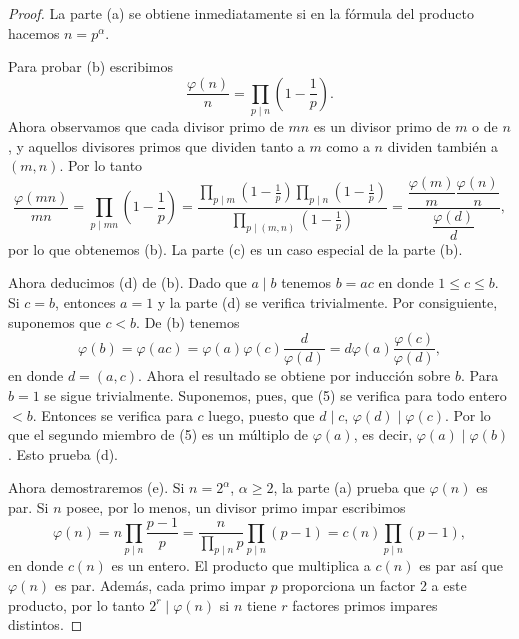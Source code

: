 \documentclass[12pt,a4paper]{book}
\begin{document}
    \begin{proof}
        La parte (a) se obtiene inmediatamente si en la fórmula del producto hacemos
        $n=p^{\alpha}$.

        Para probar (b) escribimos
        \begin{equation*}
            \frac{\varphi(n)}{n}=\prod_{p\mid n}\left(1-\frac{1}{p}\right).
        \end{equation*}
        Ahora observamos que cada divisor primo de $mn$ es un divisor primo de $m$ o de $n$,
        y aquellos divisores primos que dividen tanto a $m$ como a $n$ dividen también a
        $(m,n)$. Por lo tanto
        \begin{equation*}
            \frac{\varphi(mn)}{mn}=\prod_{p\mid mn}\left(1-\frac{1}{p}\right)
            =\frac{\displaystyle\prod_{p\mid m}\left(1-\frac{1}{p}\right)
            \prod_{p\mid n}\left(1-\frac{1}{p}\right)}{\displaystyle\prod_{p\mid(m,n)}
            \left(1-\frac{1}{p}\right)}
            =\frac{\dfrac{\varphi(m)}{m}\dfrac{\varphi(n)}{n}}{\dfrac{\varphi(d)}{d}},
        \end{equation*}
        por lo que obtenemos (b). La parte (c) es un caso especial de la parte (b).

        Ahora deducimos (d) de (b). Dado que $a\mid b$ tenemos $b=ac$ en donde
        $1\leq c\leq b$. Si $c=b$, entonces $a=1$ y la parte (d) se verifica trivialmente.
        Por consiguiente, suponemos que $c<b$. De (b) tenemos
        \begin{equation}
            \varphi(b)=\varphi(ac)=\varphi(a)\varphi(c)\frac{d}{\varphi(d)}
            =d\varphi(a)\frac{\varphi(c)}{\varphi(d)},
        \end{equation}
        en donde $d=(a,c)$. Ahora el resultado se obtiene por inducción sobre $b$. Para
        $b=1$ se sigue trivialmente. Suponemos, pues, que (5) se verifica para todo entero
        $<b$. Entonces se verifica para $c$ luego, puesto que $d\mid c$, $\varphi(d)\mid
        \varphi(c)$. Por lo que el segundo miembro de (5) es un múltiplo de $\varphi(a)$, es
        decir, $\varphi(a)\mid\varphi(b)$. Esto prueba (d).

        Ahora demostraremos (e). Si $n=2^{\alpha}$, $\alpha\geq2$, la parte (a) prueba que
        $\varphi(n)$ es par. Si $n$ posee, por lo menos, un divisor primo impar escribimos
        \begin{equation*}
            \varphi(n)=n\prod_{p\mid n}\frac{p-1}{p}
            =\frac{n}{\displaystyle\prod_{p\mid n}p}\prod_{p\mid n}(p-1)=c(n)\prod_{p\mid n}(p-1),
        \end{equation*}
        en donde $c(n)$ es un entero. El producto que multiplica a $c(n)$ es par así que
        $\varphi(n)$ es par. Además, cada primo impar $p$ proporciona un factor 2 a este
        producto, por lo tanto $2^{r}\mid\varphi(n)$ si $n$ tiene $r$ factores primos impares
        distintos.
    \end{proof}
\end{document}
